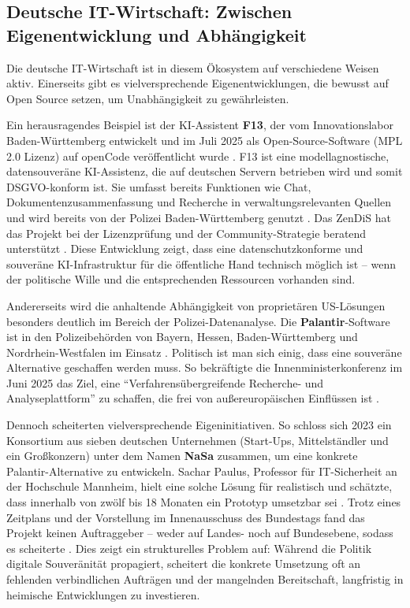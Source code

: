 \documentclass[12pt,a4paper]{article}
\begin{document}
	\subsection{Deutsche IT-Wirtschaft: Zwischen Eigenentwicklung und Abhängigkeit}
	
	Die deutsche IT-Wirtschaft ist in diesem Ökosystem auf verschiedene Weisen aktiv. Einerseits gibt es vielversprechende Eigenentwicklungen, die bewusst auf Open Source setzen, um Unabhängigkeit zu gewährleisten.
	
	Ein herausragendes Beispiel ist der KI-Assistent \textbf{F13}, der vom Innovationslabor Baden-Württemberg entwickelt und im Juli 2025 als Open-Source-Software (MPL 2.0 Lizenz) auf openCode veröffentlicht wurde \cite{Staatsanzeiger2025}. F13 ist eine modellagnostische, datensouveräne KI-Assistenz, die auf deutschen Servern betrieben wird und somit DSGVO-konform ist. Sie umfasst bereits Funktionen wie Chat, Dokumentenzusammenfassung und Recherche in verwaltungsrelevanten Quellen und wird bereits von der Polizei Baden-Württemberg genutzt \cite{Staatsanzeiger2025}. Das ZenDiS hat das Projekt bei der Lizenzprüfung und der Community-Strategie beratend unterstützt \cite{ZenDiS2025b}. Diese Entwicklung zeigt, dass eine datenschutzkonforme und souveräne KI-Infrastruktur für die öffentliche Hand technisch möglich ist – wenn der politische Wille und die entsprechenden Ressourcen vorhanden sind.
	
	Andererseits wird die anhaltende Abhängigkeit von proprietären US-Lösungen besonders deutlich im Bereich der Polizei-Datenanalyse. Die \textbf{Palantir}-Software ist in den Polizeibehörden von Bayern, Hessen, Baden-Württemberg und Nordrhein-Westfalen im Einsatz \cite{Tagesschau2025b}. Politisch ist man sich einig, dass eine souveräne Alternative geschaffen werden muss. So bekräftigte die Innenministerkonferenz im Juni 2025 das Ziel, eine \enquote{Verfahrensübergreifende Recherche- und Analyseplattform} zu schaffen, die frei von außereuropäischen Einflüssen ist \cite{Tagesschau2025b}.
	
	Dennoch scheiterten vielversprechende Eigeninitiativen. So schloss sich 2023 ein Konsortium aus sieben deutschen Unternehmen (Start-Ups, Mittelständler und ein Großkonzern) unter dem Namen \textbf{NaSa} zusammen, um eine konkrete Palantir-Alternative zu entwickeln. Sachar Paulus, Professor für IT-Sicherheit an der Hochschule Mannheim, hielt eine solche Lösung für realistisch und schätzte, dass innerhalb von zwölf bis 18 Monaten ein Prototyp umsetzbar sei \cite{Tagesschau2025b}. Trotz eines Zeitplans und der Vorstellung im Innenausschuss des Bundestags fand das Projekt keinen Auftraggeber – weder auf Landes- noch auf Bundesebene, sodass es scheiterte \cite{Tagesschau2025b}. Dies zeigt ein strukturelles Problem auf: Während die Politik digitale Souveränität propagiert, scheitert die konkrete Umsetzung oft an fehlenden verbindlichen Aufträgen und der mangelnden Bereitschaft, langfristig in heimische Entwicklungen zu investieren.
	
\end{document}
